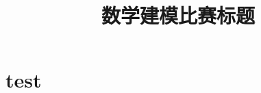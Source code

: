 \documentclass[withoutpreface,bwprint]{cumcmthesis} %
\title{数学建模比赛标题}
\begin{document}
\maketitle

\begin{abstract}




\end{abstract}


\tableofcontents








\section{test}


\newpage


\end{document}
